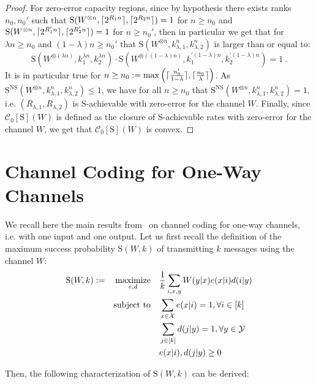 \begin{proof}
For zero-error capacity regions, since by hypothesis there exists ranks $n_0,n_0'$ such that $\mathrm{S}(W^{\otimes n},\lceil2^{R_1n}\rceil,\lceil2^{R_2n}\rceil) = 1$ for $n \geq n_0$ and $\mathrm{S}(W^{\otimes n},\lceil2^{R_1'n}\rceil,\lceil2^{R_2'n}\rceil) = 1$ for $n \geq n_0'$, then in particular we get that for $\lambda n \geq n_0$ and $(1-\lambda) n \geq n_0'$ that $\mathrm{S}(W^{\otimes n},k^n_{\lambda,1},k^n_{\lambda, 2})$ is larger than or equal to:
\[ \mathrm{S}(W^{\otimes (\lambda n)}, k_1^{\lambda n}, k_2^{\lambda n}) \cdot \mathrm{S}(W^{\otimes ((1-\lambda) n)}, k_1^{\prime (1-\lambda) n}, k_2^{\prime (1-\lambda) n}) = 1 \ .\]
It is in particular true for $n \geq n_0 := \max\left(\lceil\frac{n_0'}{1-\lambda}\rceil,\lceil\frac{n_0}{\lambda}\rceil\right)$. As $\mathrm{S}^{\mathrm{NS}}(W^{\otimes n},k^n_{\lambda,1},k^n_{\lambda,2}) \leq 1$, we have  for all $n \geq n_0$ that $\mathrm{S}^{\mathrm{NS}}(W^{\otimes n},k^n_{\lambda,1},k^n_{\lambda,2}) = 1$, i.e. $(R_{\lambda,1},R_{\lambda,2})$ is $\mathrm{S}$-achievable with zero-error for the channel $W$.  Finally, since $\mathcal{C}_0[\mathrm{S}](W)$ is defined as the closure of $\mathrm{S}$-achievable rates with zero-error for the channel $W$, we get that $\mathcal{C}_0[\mathrm{S}](W)$ is convex.
\end{proof}
 
\section{Channel Coding for One-Way Channels}
\label{subsection:onewaychannelcoding} 
We recall here the main results from~\cite{BF18} on channel coding for one-way channels, i.e. with one input and one output. Let us first recall the definition of the maximum success probability $\mathrm{S}(W,k)$ of transmitting $k$ messages using the channel $W$:
\begin{equation}
  \begin{aligned}
    \mathrm{S}(W,k) := &&\underset{e,d}{\operatorname{\text{maximize}}} &&& \frac{1}{k} \sum_{i,x,y} W(y|x)e(x|i)d(i|y)\\
    &&\operatorname{\text{subject to}} &&& \sum_{x \in \mathcal{X}} e(x|i) = 1, \forall i \in [k]\\
    &&&&& \sum_{j \in [k]} d(j|y) = 1, \forall y \in \mathcal{Y}\\
    &&&&& e(x|i), d(j|y) \geq 0
  \end{aligned}
\end{equation}

Then, the following characterization of $\mathrm{S}(W,k)$ can be derived:

